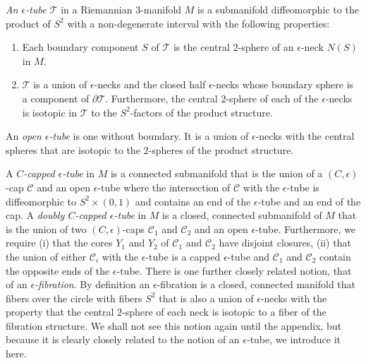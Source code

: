 \begin{definition}\label{def:epsilon-tube}
\label{epstube}
{\em An $\epsilon$-tube ${\mathcal T}$} in
a Riemannian $3$-manifold $M$ is a submanifold diffeomorphic to the
product of $S^2$ with a non-degenerate interval with the following
properties:
\begin{enumerate}
\item[(1)] Each boundary component $S$ of ${\mathcal T}$ is the central
$2$-sphere of an $\epsilon$-neck $N(S)$ in $M$.
\item[(2)] ${\mathcal T}$
is a union of $\epsilon$-necks and the closed half $\epsilon$-necks
whose boundary sphere is a component of $\partial{\mathcal T}$.
Furthermore, the central $2$-sphere of each of the $\epsilon$-necks
is isotopic in ${\mathcal T}$ to the $S^2$-factors of the product
structure.
\end{enumerate}

An {\em open $\epsilon$-tube} is one without boundary. It is a union
of $\epsilon$-necks with the central spheres that are isotopic to
the $2$-spheres of the product structure.


A {\em $C$-capped $\epsilon$-tube}
in $M$ is a connected submanifold that is the union of a
$(C,\epsilon)$-cap ${\mathcal C}$
 and an open $\epsilon$-tube where the intersection of ${\mathcal C}$ with the
$\epsilon$-tube   is diffeomorphic to $S^2\times (0,1)$ and contains
an end of the $\epsilon$-tube and an end of the cap.
 A {\em doubly $C$-capped
$\epsilon$-tube} in $M$ is a
closed, connected submanifold of $M$ that is the union of two
$(C,\epsilon)$-caps ${\mathcal C}_1$ and ${\mathcal C}_2$  and  an
open $\epsilon$-tube. Furthermore, we require (i) that the cores
$Y_1$ and $Y_2$ of ${\mathcal C}_1$ and ${\mathcal C}_2$ have
disjoint closures, (ii) that the union of either ${\mathcal C}_i$
with the $\epsilon$-tube is  a capped $\epsilon$-tube and ${\mathcal
C}_1$ and ${\mathcal C}_2$ contain the opposite ends of the
$\epsilon$-tube. There is one further closely related notion, that
of an {\em $\epsilon$-fibration}. By
definition an $\epsilon$-fibration is a closed, connected manifold
that fibers over the circle with fibers $S^2$ that is also a union
of $\epsilon$-necks with the property that the central $2$-sphere of
each neck is isotopic to a fiber of the fibration structure. We
shall not see this notion again until the appendix, but because it
is clearly closely related to the notion of an $\epsilon$-tube, we
introduce it here.
\end{definition}

